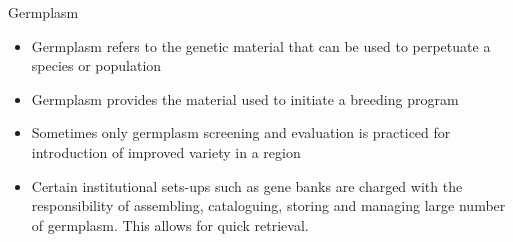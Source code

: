 \documentclass[
  ignorenonframetext,
  aspectratio=169]{beamer}
\providecommand{\tightlist}{%
  \setlength{\itemsep}{0pt}\setlength{\parskip}{0pt}}
\begin{document}
\begin{frame}{Germplasm}
\protect\hypertarget{germplasm}{}
\begin{itemize}
\tightlist
\item
  Germplasm refers to the genetic material that can be used to
  perpetuate a species or population
\item
  Germplasm provides the material used to initiate a breeding program
\item
  Sometimes only germplasm screening and evaluation is practiced for
  introduction of improved variety in a region
\item
  Certain institutional sets-ups such as gene banks are charged with the
  responsibility of assembling, cataloguing, storing and managing large
  number of germplasm. This allows for quick retrieval.
\end{itemize}
\end{frame}
\end{document}
